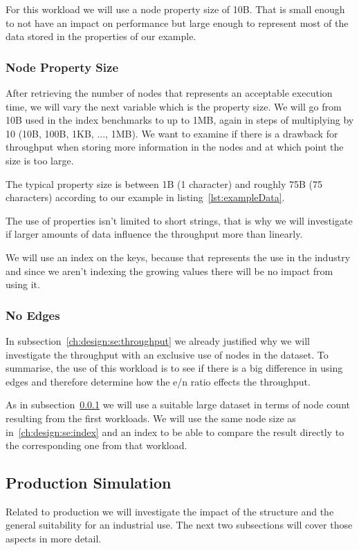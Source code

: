For this workload we will use a node property size of 10B.
That is small enough to not have an impact on performance but large enough to represent most of the data stored in the properties of our example.

\subsubsection{Node Property Size}
\label{ch:design:se:nodePropertySize}
After retrieving the number of nodes that represents an acceptable execution time,
we will vary the next variable which is the property size.
We will go from 10B used in the index benchmarks to up to 1MB,
again in steps of multiplying by 10 (10B, 100B, 1KB, ..., 1MB).
We want to examine if there is a drawback for throughput when storing more information in the nodes and at which point the size is too large.

The typical property size is between 1B (1 character) and roughly 75B (75 characters) according to our example in listing~\ref{lst:exampleData}.

The use of properties isn't limited to short strings,
that is why we will investigate if larger amounts of data influence the throughput more than linearly.

We will use an index on the keys,
because that represents the use in the industry and since we aren't indexing the growing values there will be no impact from using it.

\subsubsection{No Edges}
\label{ch:design:se:noEdges}
In subsection~\ref{ch:design:se:throughput} we already justified why we will investigate the throughput with an exclusive use of nodes in the dataset.
To summarise,
the use of this workload is to see if there is a big difference in using edges and therefore determine how the e/n ratio effects the throughput.

As in subsection~\ref{ch:design:se:nodePropertySize} we will use a suitable large dataset in terms of node count resulting from the first workloads.
We will use the same node size as in~\ref{ch:design:se:index} and an index to be able to compare the result directly to the corresponding one from that workload.

\subsection{Production Simulation}
\label{ch:design:se:productionSimulation}
Related to production we will investigate the impact of the structure and the general suitability for an industrial use.
The next two subsections will cover those aspects in more detail.

